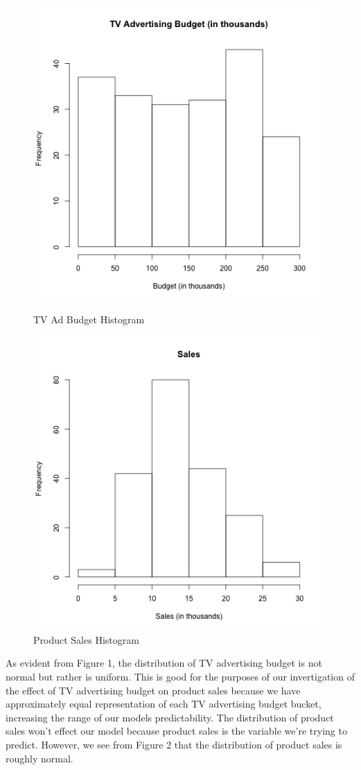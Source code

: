 \documentclass[12pt]{article}\usepackage[]{graphicx}\usepackage[]{color}
\begin{document}
\begin{figure}[h]
\centering
\begin{minipage}{.5\textwidth}
  \centering
  \includegraphics[width=.75\textwidth]{histogram-tv.png}
  \caption{TV Ad Budget Histogram}
\end{minipage}%
\begin{minipage}{.5\textwidth}
  \centering
  \includegraphics[width=.75\textwidth]{histogram-sales.png}
  \caption{Product Sales Histogram}
\end{minipage}
\end{figure}

As evident from Figure 1, the distribution of TV advertising budget is not normal but rather is uniform. This is good for the purposes of our invertigation of the effect of TV advertising budget on product sales because we have approximately equal representation of each TV advertising budget bucket, increasing the range of our models predictability. The distribution of product sales won't effect our model because product sales is the variable we're trying to predict. However, we see from Figure 2 that the distribution of product sales is roughly normal.
\end{document}
